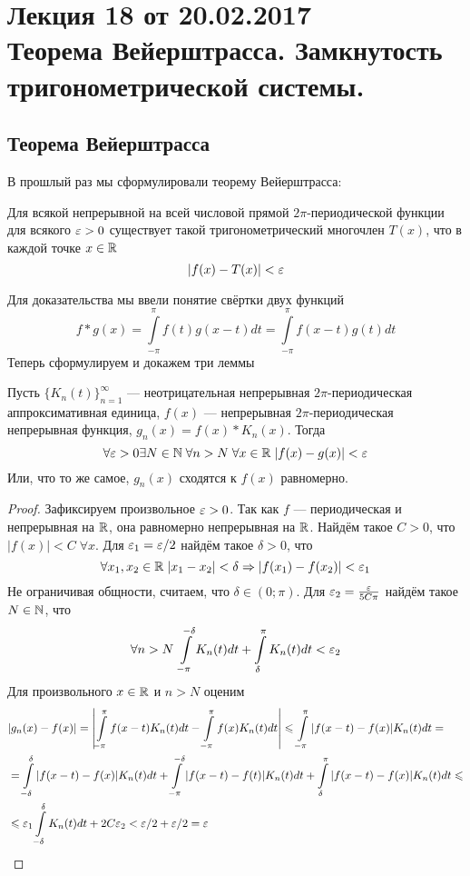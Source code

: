 \documentclass[a4paper, 12pt]{article}
\begin{document}
\newcommand{\y}{\hat{y}}
\newcommand{\lmao}{неотрицательная непрерывная $2\pi$-периодическая аппроксимативная единица}
\pagestyle{fancy}
\section{Лекция 18 от 20.02.2017 \\  Теорема Вейерштрасса. Замкнутость тригонометрической системы.}
\subsection{Теорема Вейерштрасса}
В прошлый раз мы сформулировали теорему Вейерштрасса:
\begin{Theorem}
	Для всякой непрерывной на всей числовой прямой $2\pi$-периодической функции для всякого $\varepsilon>0$ существует такой тригонометрический многочлен $T(x)$, что в каждой точке $x \in \mathbb{R}$ $$
	 |f(x)-T(x)| < \varepsilon
	$$
\end{Theorem}
	Для доказательства мы ввели понятие свёртки двух функций
	$$
		f*g(x) = \int\limits_{-\pi}^{\pi} f(t)g(x-t)dt = \int\limits_{-\pi}^{\pi}f(x-t)g(t)dt
	$$
	Теперь сформулируем и докажем три леммы
\begin{Lemma}
	Пусть $\{K_n(t)\}_{n=1}^{\infty}$ --- \lmao, $f(x)$ --- непрерывная $2\pi$-периодическая непрерывная функция, $g_n(x) = f(x)*K_n(x)$. Тогда 
	$$
		\forall \varepsilon>0 \exists N\in \mathbb{N}\; \forall n>N\; \forall x\in\mathbb{R}\; |f(x) - g(x)| < \varepsilon
	$$
	Или, что то же самое, $g_n(x)$ сходятся к $f(x)$ равномерно.
	\begin{proof}
		Зафиксируем произвольное $\varepsilon > 0$. Так как $f$ --- периодическая и непрерывная на $\mathbb{R}$, она равномерно непрерывная на $\mathbb{R}$. Найдём такое $C>0$, что $|f(x)| <C\; \forall x$. Для $\varepsilon_1 = \varepsilon/2$ найдём такое $\delta > 0$, что
		$$
			\forall x_1, x_2\in  \mathbb{R}\; |x_1-x_2| < \delta \Rightarrow |f(x_1) - f(x_2)| < \varepsilon_1 
		$$
		Не ограничивая общности, считаем, что $\delta \in (0; \pi)$.
		Для $\varepsilon_2 = \frac{\varepsilon}{5C\pi}$ найдём такое $N\in \mathbb{N}$, что
		$$
			\forall n>N\; \int\limits_{-\pi}^{-\delta}  K_n(t)dt+ \int\limits_{\delta}^{\pi} K_n(t)dt < \varepsilon_2
		$$
		Для произвольного $x\in \mathbb{R}$ и $n >N$ оценим
		\begin{align*}
			&|g_n(x) - f(x)|= \left| \int \limits_{-\pi}^{\pi}f(x-t)K_n(t)dt - \int \limits_{-\pi}^{\pi}f(x)K_n(t)dt\right| \leqslant \int \limits_{-\pi}^{\pi}|f(x-t) -f(x)|K_n(t) dt =\\&= \int \limits_{-\delta}^{\delta}|f(x-t) - f(x)|K_n(t)dt + \int \limits_{-\pi}^{-\delta}|f(x-t) - f(t)|K_n(t)dt + \int \limits_{\delta}^{\pi}|f(x-t) - f(x)|K_n(t)dt \leqslant \\ &\leqslant
			\varepsilon_1 \int \limits_{-\delta}^{\delta}K_n(t)dt + 2C\varepsilon_2 < \varepsilon/2 + \varepsilon/2 = \varepsilon
		\end{align*}
	\end{proof}
\end{Lemma}
\end{document}
